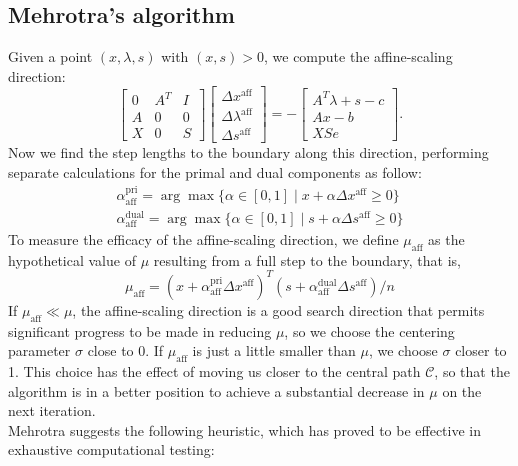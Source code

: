 \documentclass[a4paper,10 pt,titlepage,twoside]{book}
\theoremstyle{plain}
\theoremstyle{definition}
\theoremstyle{remark}
\begin{document}
\subsection*{Mehrotra's algorithm}
Given a point $(x, \lambda, s)$ with $(x, s)> 0$, we compute the affine-scaling direction:
\begin{equation}\label{(A)}
\begin{bmatrix}
0&A^{T}&I \\A&0&0\\X&0&S
\end{bmatrix}\begin{bmatrix}
\Delta x^{\text{aff}}\\\Delta\lambda^{\text{aff}}\\\Delta s^{\text{aff}}
\end{bmatrix}=-\begin{bmatrix}
A^{T}\lambda+s-c\\Ax-b\\XSe
\end{bmatrix}.
\end{equation}
Now we find the step lengths to the boundary along this direction, performing separate calculations for the primal and dual components as follow:
\begin{align}\label{Qw}
\alpha_{\text{aff}}^{\text{pri}}=\arg\max\{\alpha\in[0,1]\;|\;x +\alpha\Delta x^{\text{aff}}\geq 0\} \\
\alpha_{\text{aff}}^{\text{dual}}=\arg\max\{\alpha\in[0,1]\;|\;s +\alpha\Delta s^{\text{aff}}\geq 0\}
\end{align}
To measure the efficacy of the affine-scaling direction, we define $\mu_{\text{aff}}$ as the hypothetical value of $\mu$ resulting from a full step to the boundary, that is,
\begin{equation*}
	\mu_{\text{aff}}= (x+\alpha_{\text{aff}}^{\text{pri}}\Delta x^{\text{aff}})^{T}(s+\alpha_{\text{aff}}^{\text{dual}}\Delta s^{\text{aff}})/n
\end{equation*}
If $\mu_{\text{aff}}\ll\mu$, the affine-scaling direction is a good search direction that permits significant progress to be made in reducing $\mu$, so we choose the centering parameter $\sigma$ close to 0. If $\mu_{\text{aff}}$ is just a little smaller than $\mu$, we choose $\sigma$ closer to 1. This choice has the effect of moving us closer  to the central path $\mathcal{C}$, so that the algorithm is in a better position to achieve a substantial decrease in $\mu$ on the next iteration.\\
Mehrotra \cite{MER} suggests the following heuristic, which has proved to be effective in exhaustive computational testing:
\end{document}
